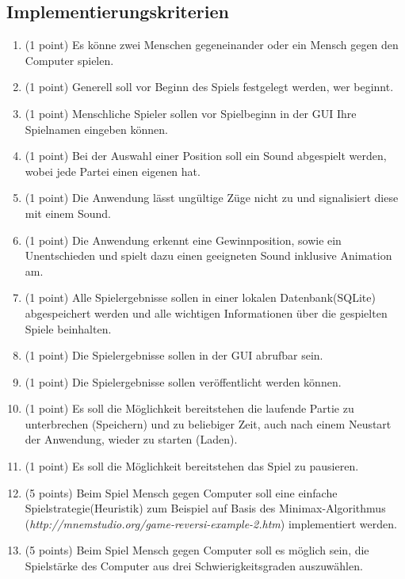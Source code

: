 \documentclass[a4paper]{scrartcl}
\begin{document}
\subsection{Implementierungskriterien}
	\begin{enumerate}
		\item (1 point) Es könne zwei Menschen gegeneinander oder ein Mensch gegen den Computer spielen.
		\item (1 point) Generell soll vor Beginn des Spiels festgelegt werden, wer beginnt.
		\item (1 point) Menschliche Spieler sollen vor Spielbeginn in der GUI Ihre Spielnamen eingeben können.
		
		
		\item (1 point) Bei der Auswahl einer Position soll ein Sound abgespielt werden, wobei jede Partei einen eigenen hat.
		\item (1 point) Die Anwendung lässt ungültige Züge nicht zu und signalisiert diese mit einem Sound.
		\item (1 point) Die Anwendung erkennt eine Gewinnposition, sowie ein Unentschieden und spielt dazu einen geeigneten Sound inklusive Animation am.
		\item (1 point) Alle Spielergebnisse sollen in einer lokalen Datenbank(SQLite) abgespeichert werden und alle wichtigen Informationen über die gespielten Spiele beinhalten.
		\item (1 point) Die Spielergebnisse sollen in der GUI abrufbar sein.
		\item (1 point) Die Spielergebnisse sollen veröffentlicht werden können.
		\item (1 point) Es soll die Möglichkeit bereitstehen die laufende Partie zu unterbrechen (Speichern) und zu beliebiger Zeit, auch nach einem Neustart der Anwendung, wieder zu starten (Laden).
		\item (1 point) Es soll die Möglichkeit bereitstehen das Spiel zu pausieren.
		\item (5 points) Beim Spiel Mensch gegen Computer soll eine einfache Spielstrategie(Heuristik) zum Beispiel auf Basis des Minimax-Algorithmus (\textit{http://mnemstudio.org/game-reversi-example-2.htm}) implementiert werden.	
		\item (5 points) Beim Spiel Mensch gegen Computer soll es möglich sein, die Spielstärke des Computer aus drei Schwierigkeitsgraden auszuwählen.
		

\end{enumerate}
\end{document}
